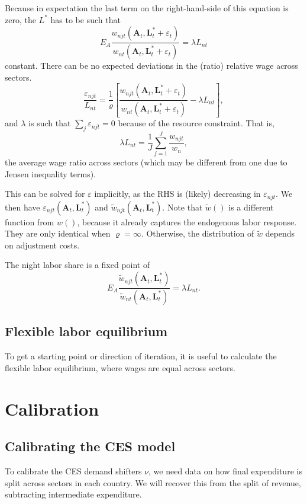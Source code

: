 \documentclass[12pt]{article}
\begin{document}
Because in expectation the last term on the right-hand-side of this equation is zero, the $L^*$ has to be such that
\[
E_{A}\frac 
	{w_{njt}(\mathbf A_{t}, \mathbf L_{t}^*+\varepsilon_t)}
	{w_{nt}(\mathbf A_{t}, \mathbf L_{t}^*+\varepsilon_t)}
= \lambda L_{nt}
\]
constant. There can be no expected deviations in the (ratio) relative wage across sectors. 
\begin{equation}\label{eq:varepsilon}
\frac {\varepsilon_{njt}} {L_{nt}}
=
\frac 1\varrho
\left[
\frac 
	{w_{njt}(\mathbf A_{t}, \mathbf L_{t}^*+\varepsilon_t)}
	{w_{nt}(\mathbf A_{t}, \mathbf L_{t}^*+\varepsilon_t)}
	-\lambda L_{nt}
\right],
\end{equation}
and $\lambda$ is such that $\sum_j\varepsilon_{njt}=0$ because of the resource constraint. That is, 
\[
\lambda L_{nt} = \frac1J \sum_{j=1}^{J} \frac{w_{njt}} {w_n},
\]
the average wage ratio across sectors (which may be different from one due to Jensen inequality terms).

This can be solved for $\varepsilon$ implicitly, as the RHS is (likely) decreasing in $\varepsilon_{njt}$. We then have $\varepsilon_{njt}(\mathbf A_t, \mathbf L_t^*)$ and $\tilde w_{njt}(\mathbf A_t, \mathbf L_t^*)$. Note that $\tilde w()$ is a different function from $w()$, because it already captures the endogenous labor response. They are only identical when $\varrho=\infty$. Otherwise, the distribution of $\tilde w$ depends on adjustment costs. 

The night labor share is a fixed point of
\[
E_{A}\frac 
	{\tilde w_{njt}(\mathbf A_{t}, \mathbf L_{t}^*)}
	{\tilde w_{nt}(\mathbf A_{t}, \mathbf L_{t}^*)}
= \lambda L_{nt}.
\]

\subsection{Flexible labor equilibrium}
To get a starting point or direction of iteration, it is useful to calculate the flexible labor equilibrium, where wages are equal across sectors.


\section{Calibration}
\subsection{Calibrating the CES model}
To calibrate the CES demand shifters $\nu$, we need data on how final expenditure is split across sectors in each country. We will recover this from the split of revenue, subtracting intermediate expenditure.
\end{document}
